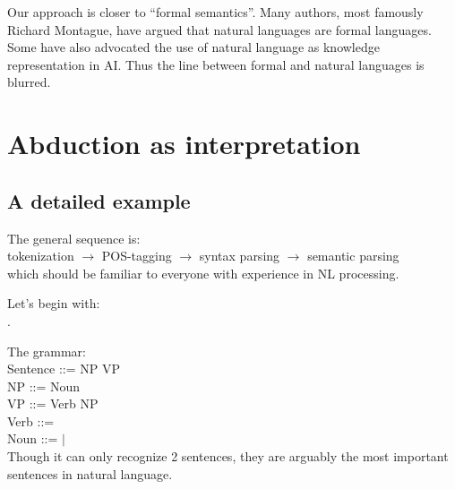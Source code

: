 Our approach is closer to ``formal semantics''.  Many authors, most famously Richard Montague, have argued that natural languages are formal languages.  Some have also advocated the use of natural language as knowledge representation in AI.  Thus the line between formal and natural languages is blurred.


\section{Abduction as interpretation}
\label{sec:abduction-as-interpretation}

\subsection{A detailed example}

The general sequence is:\\
\hspace*{1cm} tokenization $\rightarrow$ POS-tagging $\rightarrow$ syntax parsing $\rightarrow$ semantic parsing\\
which should be familiar to everyone with experience in NL processing.

Let's begin with:\\
\tab {}.

The grammar:\\
\tab Sentence ::= NP VP\\
\tab NP ::= Noun\\
\tab VP ::= Verb NP\\
\tab Verb ::=  \\
\tab Noun ::=  $|$ \\
Though it can only recognize 2 sentences, they are arguably the most important sentences in natural language.

